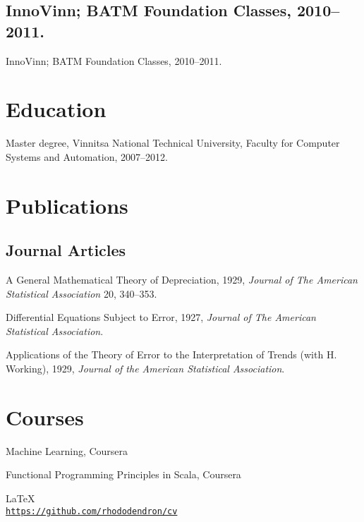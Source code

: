 \documentclass[letterpaper]{article}
\def\footerlink{https://github.com/rhododendron/cv}
\renewenvironment{itemize}{
  \begin{list}{}{
    \setlength{\leftmargin}{1.5em}
  }
}{
  \end{list}
}
\begin{document}
\subsection*{InnoVinn; BATM Foundation Classes, 2010--2011.}

\begin{itemize}
\item InnoVinn; BATM Foundation Classes, 2010--2011.
\end{itemize}

\section*{Education}

\begin{itemize}

  \item Master degree, Vinnitsa National Technical University, Faculty for Computer 
Systems and Automation, 2007--2012.

\end{itemize}

\section*{Publications}

\subsection*{Journal Articles}

\begin{itemize}
\item A General Mathematical Theory of Depreciation, 1929, {\it Journal
    of The American Statistical Association} 20, 340--353.
\item Differential Equations Subject to Error, 1927, {\it Journal of The
    American Statistical Association}.
\item Applications of the Theory of Error to the Interpretation of
  Trends (with H. Working), 1929, {\it Journal of the American
    Statistical Association}.
\end{itemize}

\section*{Courses}

\begin{itemize}
\item Machine Learning, Coursera
\end{itemize}

\begin{itemize}
\item Functional Programming Principles in Scala, Coursera
\end{itemize}

\bigskip

\begin{center}
  \begin{footnotesize}
    \LaTeX \\
    \href{\footerlink}{\texttt{\footerlink}}
  \end{footnotesize}
\end{center}
\end{document}
